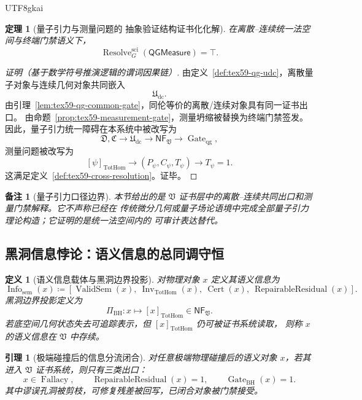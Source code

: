 \documentclass[12pt]{article}
\newtheorem{definition}{定义}[section]
\newtheorem{theorem}{定理}[section]
\newtheorem{lemma}{引理}[section]
\newtheorem{remark}{备注}[section]
\newcommand{\Udc}{\mathfrak{U}_{\mathrm{dc}}}
\newcommand{\Vsys}{\mathfrak V}
\newcommand{\NF}{\mathsf{NF}}
\newcommand{\DefEq}{\coloneqq}
\DeclareMathOperator{\Cert}{Cert}
\DeclareMathOperator{\Fallacy}{Fallacy}
\DeclareMathOperator{\Resolve}{Resolve}
\DeclareMathOperator{\Gate}{Gate}
\DeclareMathOperator{\Inv}{Inv}
\DeclareMathOperator{\TotHom}{TotHom}
\DeclareMathOperator{\ValidSem}{ValidSem}
\DeclareMathOperator{\RepairableResidual}{RepairableResidual}
\DeclareMathOperator{\Info}{Info}
\begin{document}
\begin{CJK*}{UTF8}{gkai}
\begin{theorem}[量子引力与测量问题的 抽象验证结构证书化化解]
\label{thm:tex59-qg-measure-resolution}
在离散--连续统一法空间与终端门禁语义下，
\[
  \Resolve_G^{\mathrm{sci}}(\mathsf{QGMeasure})=\top.
\]
\end{theorem}

\begin{proof}[证明（基于数学符号推演逻辑的谓词因果链）]
由定义~\ref{def:tex59-qg-udc}，离散量子对象与连续几何对象共同嵌入
\[
  \Udc.
\]
由引理~\ref{lem:tex59-qg-common-gate}，同伦等价的离散/连续对象具有同一证书出口。
由命题~\ref{prop:tex59-measurement-gate}，测量坍缩被替换为终端门禁签发。
因此，量子引力统一障碍在本系统中被改写为
\[
  \mathfrak D,\mathfrak C
  \to
  \Udc
  \to
  \NF_{\Vsys}
  \to
  \Gate_{\mathrm{qg}},
\]
测量问题被改写为
\[
  [\psi]_{\TotHom}
  \to
  (P_{\psi},C_{\psi},T_{\psi})
  \to
  T_{\psi}=1.
\]
这满足定义~\ref{def:tex59-cross-resolution}。证毕。
\end{proof}

\begin{remark}[量子引力口径边界]
本节给出的是 \(\Vsys\) 证书层中的离散--连续共同出口和测量门禁解释。它不声称已经在
传统微分几何或量子场论语境中完成全部量子引力理论构造；它证明的是统一法空间内的
可审计表达替代。
\end{remark}

\subsection{黑洞信息悖论：语义信息的总同调守恒}
\label{subsec:tex59-black-hole-info}

\begin{definition}[语义信息载体与黑洞边界投影]
\label{def:tex59-semantic-info}
对物理对象 \(x\) 定义其语义信息为
\[
  \Info_{\mathrm{sem}}(x)
  \DefEq
  \left[
  \ValidSem(x),\
  \Inv_{\TotHom}(x),\
  \Cert(x),\
  \RepairableResidual(x)
  \right].
\]
黑洞边界投影定义为
\[
  \Pi_{\mathrm{BH}}:
  x\longmapsto [x]_{\TotHom}\in\NF_{\Vsys}.
\]
若底空间几何状态失去可追踪表示，但 \([x]_{\TotHom}\) 仍可被证书系统读取，
则称 \(x\) 的语义信息在 \(\Vsys\) 中存续。
\end{definition}

\begin{lemma}[极端碰撞后的信息分流闭合]
\label{lem:tex59-info-split}
对任意极端物理碰撞后的语义对象 \(x\)，若其进入 \(\Vsys\) 证书系统，则只有三类出口：
\[
  x\in\Fallacy,\qquad
  \RepairableResidual(x)=1,\qquad
  \Gate_{\mathrm{BH}}(x)=1.
\]
其中谬误孔洞被剪枝，可修复残差被回写，已闭合对象被门禁接受。
\end{lemma}


\end{CJK*}
\end{document}
